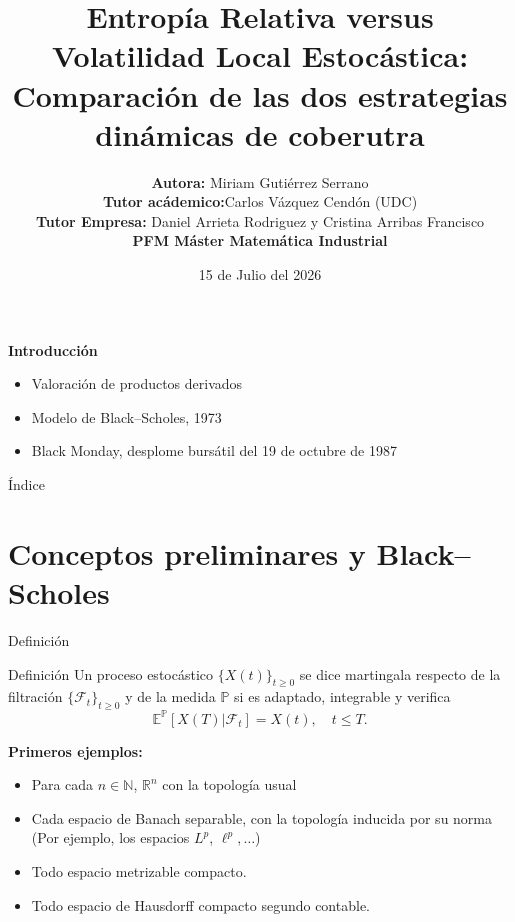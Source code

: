 \documentclass[8pt]{beamer}
\title[Entropía Relativa versus Volatilidad Local Estocástica: Comparación de las dos estrategias dinámicas de coberutra]{Entropía Relativa versus Volatilidad Local Estocástica: Comparación de las dos estrategias dinámicas de coberutra}
\author[Miriam Gutiérrez Serrano]{{\bf Autora:} Miriam Gutiérrez Serrano\\
{\bf Tutor acádemico:}Carlos Vázquez Cendón (UDC)\\ 
{\bf Tutor Empresa:} Daniel Arrieta Rodriguez y Cristina Arribas Francisco\\ 
\vspace{1cm} {\bf PFM Máster Matemática Industrial}}
\date{15 de Julio del 2026}
\begin{document}
\begin{frame}
\titlepage
\end{frame}

\begin{Large}
    \begin{frame}{\bf  {\LARGE {Introducción}}}
\begin{itemize}
    \item Valoración de productos derivados
    
\end{itemize}
\begin{itemize}
    \item Modelo de Black--Scholes, 1973
\end{itemize}
\begin{itemize}
    \item Black Monday, desplome bursátil del 19 de octubre de 1987
\end{itemize}
\end{frame}
\end{Large}




\begin{frame}{Índice}
    \begin{Large}
\tableofcontents
\end{Large}
\end{frame}


\section{Conceptos preliminares y Black--Scholes}

\begin{frame}{Definición}
\pause
  \begin{block}{Definición}
    Un proceso estocástico $\{X(t)\}_{t \geq 0}$ se dice martingala respecto de la filtración $\{\mathcal F_t\}_{t\geq 0}$ y de la medida $\mathbb P$ si es adaptado, integrable y verifica
    \[
        \mathbb{E}^\mathbb{P}[X(T) | \mathcal{F}_t] = X(t), \quad t \leq T. 
        \]
  \end{block}
  \pause
    \vspace{0.5em}
  \textbf{Primeros ejemplos:}
  \begin{itemize}
    \item Para cada $n \in \mathbb N$, $\mathbb{R}^n$ con la topología usual
    \item Cada espacio de Banach separable, con la topología inducida por su norma (Por ejemplo, los espacios $L^p$, $\ell^p,\dots$)
    \item Todo espacio metrizable compacto. 
    \item Todo espacio de Hausdorff compacto segundo contable.
  \end{itemize}
\end{frame}
\end{document}
